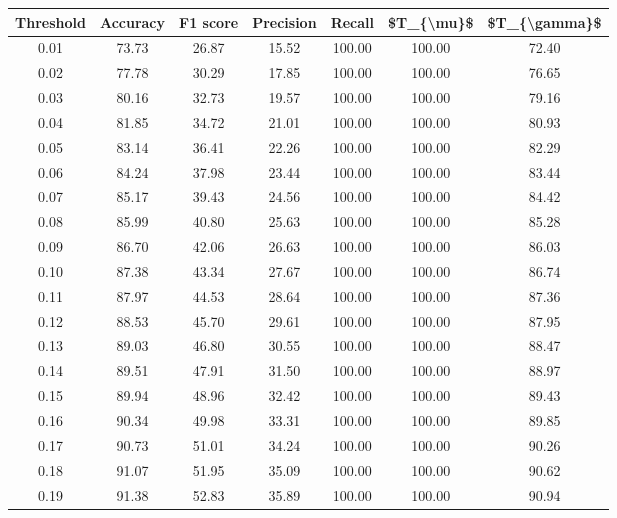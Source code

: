 \begin{tabular}{|c|c|c|c|c|c|c|}
\hline
 Threshold &  Accuracy &  F1 score &  Precision &  Recall &  \$T\_\{\textbackslash mu\}\$ &  \$T\_\{\textbackslash gamma\}\$ \\
\hline
      0.01 &     73.73 &     26.87 &      15.52 &  100.00 &     100.00 &         72.40 \\
      0.02 &     77.78 &     30.29 &      17.85 &  100.00 &     100.00 &         76.65 \\
      0.03 &     80.16 &     32.73 &      19.57 &  100.00 &     100.00 &         79.16 \\
      0.04 &     81.85 &     34.72 &      21.01 &  100.00 &     100.00 &         80.93 \\
      0.05 &     83.14 &     36.41 &      22.26 &  100.00 &     100.00 &         82.29 \\
      0.06 &     84.24 &     37.98 &      23.44 &  100.00 &     100.00 &         83.44 \\
      0.07 &     85.17 &     39.43 &      24.56 &  100.00 &     100.00 &         84.42 \\
      0.08 &     85.99 &     40.80 &      25.63 &  100.00 &     100.00 &         85.28 \\
      0.09 &     86.70 &     42.06 &      26.63 &  100.00 &     100.00 &         86.03 \\
      0.10 &     87.38 &     43.34 &      27.67 &  100.00 &     100.00 &         86.74 \\
      0.11 &     87.97 &     44.53 &      28.64 &  100.00 &     100.00 &         87.36 \\
      0.12 &     88.53 &     45.70 &      29.61 &  100.00 &     100.00 &         87.95 \\
      0.13 &     89.03 &     46.80 &      30.55 &  100.00 &     100.00 &         88.47 \\
      0.14 &     89.51 &     47.91 &      31.50 &  100.00 &     100.00 &         88.97 \\
      0.15 &     89.94 &     48.96 &      32.42 &  100.00 &     100.00 &         89.43 \\
      0.16 &     90.34 &     49.98 &      33.31 &  100.00 &     100.00 &         89.85 \\
      0.17 &     90.73 &     51.01 &      34.24 &  100.00 &     100.00 &         90.26 \\
      0.18 &     91.07 &     51.95 &      35.09 &  100.00 &     100.00 &         90.62 \\
      0.19 &     91.38 &     52.83 &      35.89 &  100.00 &     100.00 &         90.94 \\

\end{tabular}
